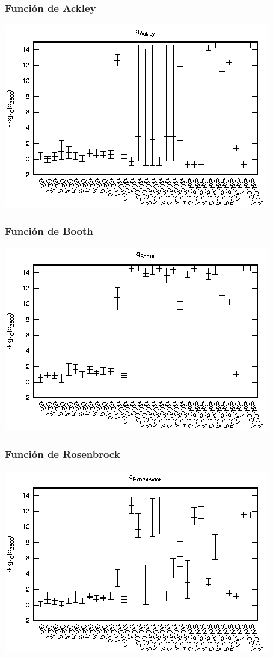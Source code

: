 \documentclass{beamer}
\begin{document}
\begin{frame}
	\frametitle{Función de Ackley}
	\includegraphics[width=\textwidth]{Ackley-e.eps}
\end{frame}

\begin{frame}
	\frametitle{Función de Booth}
	\includegraphics[width=\textwidth]{Booth-e.eps}
\end{frame}

\begin{frame}
	\frametitle{Función de Rosenbrock}
	\includegraphics[width=\textwidth]{Rosenbrock-e.eps}
\end{frame}
\end{document}
